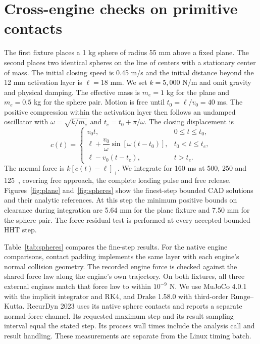 \section{Cross-engine checks on primitive contacts}
\label{sec:analytic}
The first fixture places a 1 kg sphere of radius 55 mm above a fixed plane. The second places two identical spheres on the line of centers with a stationary center of mass. The initial closing speed is 0.45 m/s and the initial distance beyond the 12 mm activation layer is $\ell=18$ mm. We set $k=5{,}000$ N/m and omit gravity and physical damping. The effective mass is $m_e=1$ kg for the plane and $m_e=0.5$ kg for the sphere pair. Motion is free until $t_0=\ell/v_0=40$ ms. The positive compression within the activation layer then follows an undamped oscillator with $\omega=\sqrt{k/m_e}$ and $t_e=t_0+\pi/\omega$. The closing displacement is
\begin{equation}
 c(t)=\begin{cases}
 v_0t,&0\leq t\leq t_0,\\
 \ell+\dfrac{v_0}{\omega}\sin[\omega(t-t_0)],& t_0<t\leq t_e,\\
 \ell-v_0(t-t_e),& t>t_e.
 \end{cases}
 \label{eq:halfsine}
\end{equation}
The normal force is $k[c(t)-\ell]_+$. We integrate for 160 ms at 500, 250 and 125~\microsec{}, covering free approach, the complete loading pulse and free release. Figures~\ref{fig:plane} and~\ref{fig:spheres} show the finest-step bounded CAD solutions and their analytic references. At this step the minimum positive bounds on clearance during integration are 5.64 mm for the plane fixture and 7.50 mm for the sphere pair. The force residual test is performed at every accepted bounded HHT step.


Table~\ref{tab:spheres} compares the fine-step results. For the native engine comparisons, contact padding implements the same layer with each engine's normal collision geometry. The recorded engine force is checked against the shared force law along the engine's own trajectory. On both fixtures, all three external engines match that force law to within $10^{-9}$ N. We use MuJoCo 4.0.1 with the implicit integrator and RK4, and Drake 1.58.0 with third-order Runge--Kutta. RecurDyn 2023 uses its native sphere contacts and reports a separate normal-force channel. Its requested maximum step and its result sampling interval equal the stated step. Its process wall times include the analysis call and result handling. These measurements are separate from the Linux timing batch.

